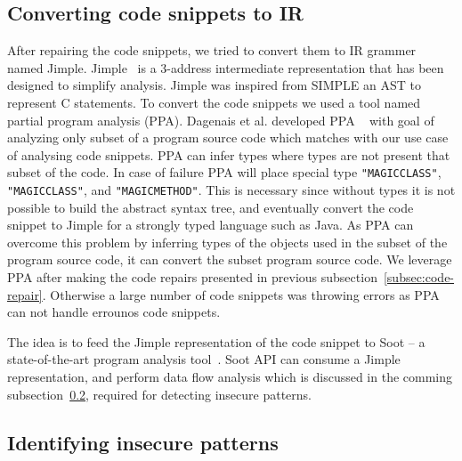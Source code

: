 \subsection{Converting code snippets to IR}
\label{subsec:converting-to-IR}
After repairing the code snippets, we tried to convert them to IR grammer named Jimple. Jimple~\cite{vallee1998jimple} is a 3-address intermediate representation that has been designed to simplify analysis. Jimple was inspired from SIMPLE an AST to represent C statements. To convert the code snippets we used a tool named partial program analysis (PPA). Dagenais et al. developed PPA ~\cite{dagenais2008enabling} with goal of analyzing only subset of a program source code which matches with our use case of analysing code snippets. PPA  can infer types where types are not present that subset of the code. In case of failure PPA will place special type \texttt{"MAGICCLASS"}, \texttt{"MAGICCLASS"}, and \texttt{"MAGICMETHOD"}. This is necessary since without types it is not possible to build the abstract syntax tree, and eventually convert the code snippet to Jimple for a strongly typed language such as Java. As PPA can overcome this problem by inferring types of the objects used in the subset of the program source code, it can convert the subset program source code. We leverage PPA after making the code repairs presented in previous subsection~\ref{subsec:code-repair}. Otherwise a large number of code snippets was throwing errors as PPA can not handle errounos code snippets.     

The idea is to feed the Jimple representation of the code snippet to Soot -- a state-of-the-art program analysis tool~\cite{soot}. Soot API can consume a Jimple representation, and perform data flow analysis which is discussed in the comming subsection~\ref{subsec:identifying-insecure-patterns}, required for detecting insecure patterns.

\subsection{Identifying insecure patterns}
\label{subsec:identifying-insecure-patterns}

